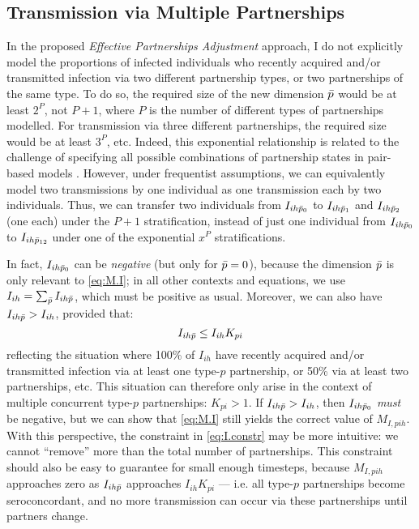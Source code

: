 \subsection{Transmission via Multiple Partnerships}\label{foi.prop.mp}
In the proposed \emph{Effective Partnerships Adjustment} approach,
I do not explicitly model the proportions of infected individuals
who recently acquired and/or transmitted infection via
two different partnership types, or two partnerships of the same type.
To do so, the required size of the new dimension $\bar{p}$ would be at least $2^{P}$, not $P+1$,
where $P$ is the number of different types of partnerships modelled.
For transmission via three different partnerships, the required size would be at least $3^P$, etc.
Indeed, this exponential relationship is related to the challenge of specifying
all possible combinations of partnership states in pair-based models \cite{Kretzschmar2017}.
However, under frequentist assumptions, we can equivalently model
two transmissions by one individual as one transmission each by two individuals.
Thus, we can transfer two individuals from $I_{ih\bar{p}_0}$ to
$I_{ih\bar{p}_1}$ and $I_{ih\bar{p}_2}$ (one each) under the $P+1$ stratification,
instead of just one individual from $I_{ih\bar{p}_0}$ to
$I_{ih\bar{p}_{12}}$ under one of the exponential $x^P$ stratifications.
\par
In fact, $I_{ih\bar{p}_0}$ can be \emph{negative} (but only for $\bar{p} = 0$),
because the dimension $\bar{p}$ is only relevant to \eqref{eq:M.I};
in all other contexts and equations,
we use $I_{ih} = \sum_{\bar{p}} I_{ih\bar{p}}$, which must be positive as usual.
Moreover, we can also have $I_{ih\bar{p}} > I_{ih}$, provided that:
\begin{equation}\label{eq:I.constr}
  I_{ih\bar{p}} \le I_{ih} K_{pi}
\end{equation}
reflecting the situation where 100\% of $I_{ih}$
have recently acquired and/or transmitted infection via at least one type-$p$ partnership,
or 50\% via at least two partnerships, etc.
This situation can therefore only arise in the context of
multiple concurrent type-$p$ partnerships: $K_{pi} > 1$.
If $I_{ih\bar{p}} > I_{ih}$, then $I_{ih\bar{p}_0}$ \emph{must} be negative,
but we can show that \eqref{eq:M.I} still yields the correct value of $M_{I,pih}$.
With this perspective, the constraint in \eqref{eq:I.constr} may be more intuitive:
we cannot ``remove'' more than the total number of partnerships.
This constraint should also be easy to guarantee for small enough timesteps,
because $M_{I,pih}$ approaches zero as $I_{ih\bar{p}}$ approaches $I_{ih} K_{pi}$
--- i.e. all type-$p$ partnerships become \hivp seroconcordant,
and no more transmission can occur via these partnerships until partners change.

